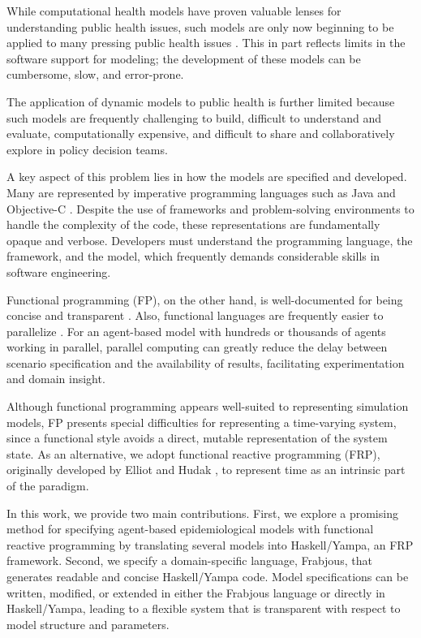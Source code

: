 \documentclass{sig-alternate}
\begin{document}
While computational health models have proven valuable lenses for understanding public health issues, such models are only now beginning to be applied to many pressing public health issues \cite{system_dyn_tradeoffs, system_dyn_approaches}. This in part reflects limits in the software support for modeling; the development of these models can be cumbersome, slow, and error-prone. %

The application of dynamic models to public health is further limited because such models are frequently challenging to build, difficult to understand and evaluate, computationally expensive, and difficult to share and collaboratively explore in policy decision teams.

A key aspect of this problem lies in how the models are specified and developed. Many are represented by imperative programming languages such as Java and Objective-C \cite{system_dyn_tradeoffs}. Despite the use of frameworks and problem-solving environments to handle the complexity of the code, these representations are fundamentally opaque and verbose. Developers must understand the programming language, the framework, and the model, which frequently demands considerable skills in software engineering.

Functional programming (FP), on the other hand, is well-doc\-u\-mented for being concise and transparent \cite{von_neumann,why_fp}. Also, functional languages are frequently easier to parallelize \cite{dphaskell, harness}. For an agent-based model with hundreds or thousands of agents working in parallel, parallel computing can greatly reduce the delay between scenario specification and the availability of results, facilitating experimentation and domain insight.

Although functional programming appears well-suited to representing simulation models, FP presents special difficulties for representing a time-varying system, since a functional style avoids a direct, mutable representation of the system state. As an alternative, we adopt functional reactive programming (FRP), originally developed by Elliot and Hudak \cite{fran}, to represent time as an intrinsic part of the paradigm.

In this work, we provide two main contributions. First, we explore a promising method for specifying agent-based epidemiological models with functional reactive programming by translating several models into Haskell/Yampa, an FRP framework. Second, we specify a domain-specific language, Frabjous, that generates readable and concise Haskell/Yampa code. Model specifications can be written, modified, or extended in either the Frabjous language or directly in Haskell/Yampa, leading to a flexible system that is transparent with respect to model structure and parameters.
\end{document}
